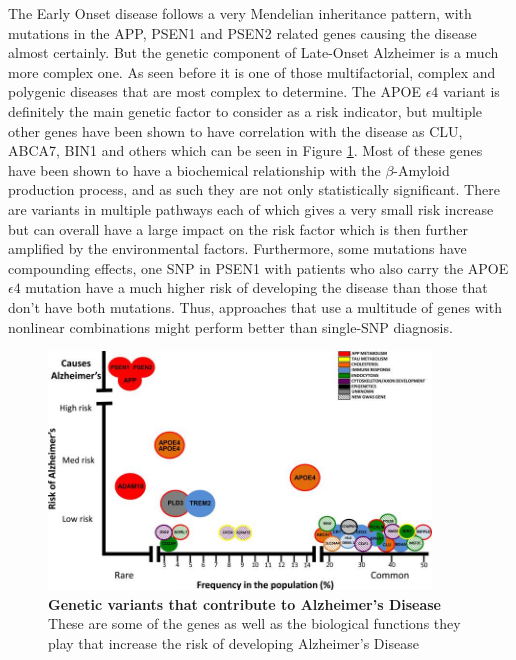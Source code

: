 The Early Onset disease follows a very Mendelian inheritance pattern, with mutations in the APP, PSEN1 and PSEN2 related genes causing the disease almost certainly. But the genetic component of Late-Onset Alzheimer is a much more complex one. As seen before it is one of those multifactorial, complex and polygenic diseases that are most complex to determine. The APOE $\epsilon4$ variant is definitely the main genetic factor to consider as a risk indicator, but multiple other genes have been shown to have correlation with the disease as CLU, ABCA7, BIN1 and others which can be seen in Figure \ref{genAD}. Most of these genes have been shown to have a biochemical relationship with the  $\beta$-Amyloid production process, and as such they are not only statistically significant. There are variants in multiple pathways each of which gives a very small risk increase but can overall have a large impact on the risk factor which is then further amplified by the environmental factors. Furthermore, some mutations have compounding effects, one SNP in PSEN1 with patients who also carry the APOE $\epsilon4$ mutation have a much higher risk of developing the disease than those that don't have both mutations. Thus, approaches that use a multitude of genes with nonlinear combinations might perform better than single-SNP diagnosis.\cite{KARCH201543}

\begin{figure}[!ht]
\centerline{\includegraphics[width=4in]{images/background/genad.jpg}}
\caption{{\bf Genetic variants that contribute to Alzheimer's Disease\cite{KARCH201543}} These are some of the genes as well as the biological functions they play that increase the risk of developing Alzheimer's Disease}
\label{genAD}
\end{figure}


